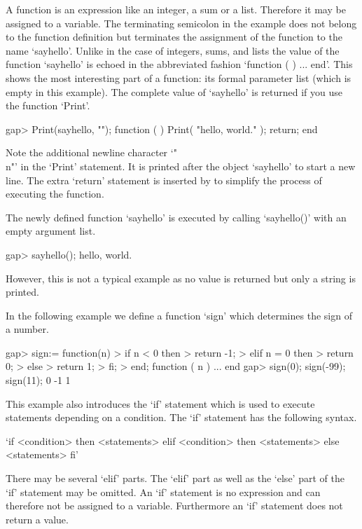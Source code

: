 A {\GAP} function is an expression  like an integer,  a sum or a list.
Therefore it may be assigned to a variable.  The terminating semicolon
in the  example   does not belong    to the  function  definition  but
terminates the  assignment  of the  function to the  name  `sayhello'.
Unlike in the case   of integers, sums, and  lists  the value of   the
function `sayhello' is echoed in the abbreviated fashion `function ( )
...   end'.  This shows the most  interesting part  of a function: its
formal parameter list (which is empty  in this example).  The complete
value of `sayhello' is returned if you use the function `Print'.

\beginexample
gap> Print(sayhello, "\n");
function (  )
    Print( "hello, world.\n" );
    return;
end
\endexample

Note  the  additional   newline  character   `"\\n"'  in  the  `Print'
statement.  It is  printed after the object  `sayhello' to start a new
line. The extra `return'  statement is inserted  by {\GAP} to simplify
the process of executing the function.

The newly defined function `sayhello' is executed by calling `sayhello()'
with an empty argument list.

\beginexample
gap> sayhello();
hello, world.
\endexample

However, this is not a typical example as no  value is returned but only a
string is printed.


In the following example we define a function `sign' which determines
the sign of a number.

\beginexample
gap> sign:= function(n)
>        if n < 0 then
>           return -1;
>        elif n = 0 then
>           return 0;
>        else
>           return 1;
>        fi;
>    end;
function ( n ) ... end
gap> sign(0); sign(-99); sign(11);
0
-1
1
\endexample

This example also introduces the `if' statement which is  used to execute
statements  depending  on  a  condition.   The  `if'  statement  has  the
following syntax.

\fmark`if <condition> then
    <statements>
elif <condition> then
    <statements>
else
    <statements>
fi'

There may be several `elif' parts.  The `elif' part as well as the `else'
part  of the  `if' statement may be omitted.   An  `if'  statement  is no
expression and  can therefore not be assigned to a variable.  Furthermore
an `if' statement does not return a value.

